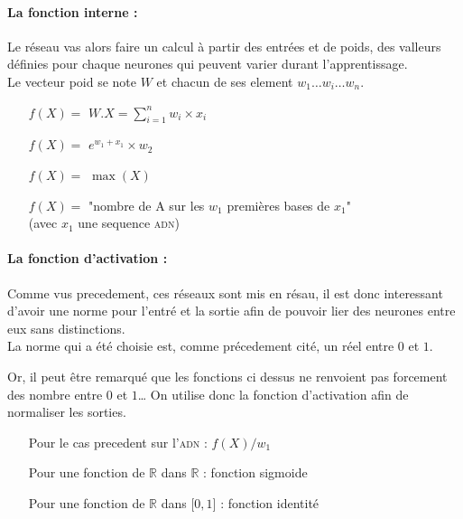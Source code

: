 \paragraph{La fonction interne :}
Le réseau vas alors faire un calcul à partir des entrées et de poids,
des valleurs définies pour chaque neurones qui peuvent varier durant l'apprentissage. \\
Le vecteur poid se note $W$ et chacun de ses element $w_1 \ldots w_i \ldots w_n$.

\exemle
{
\begin{itemize}
    \item[$f(X) =$] $W.X = \sum_{i=1}^{n} w_i \times x_i $
    \item[$f(X) =$] $e^{w_1 + x_1} \times w_2$
    \item[$f(X) =$] $\max(X)$
    \item[$f(X) =$] "nombre de A sur les $w_1$ premières bases de $x_1$" \\
            (avec $x_1$ une sequence \textsc{adn})
\end{itemize}
}

\paragraph{La fonction d'activation :}
Comme vus precedement, ces réseaux sont mis en résau,
il est donc interessant d'avoir une norme pour l'entré et la sortie
afin de pouvoir lier des neurones entre eux sans distinctions. \\
La norme qui a été choisie est, comme précedement cité, un réel entre $0$ et $1$.


Or, il peut être remarqué que les fonctions ci dessus ne renvoient pas forcement des nombre entre $0$ et $1$\ldots
On utilise donc la fonction d'activation afin de normaliser les sorties.
\exemle
{
\begin{itemize}
    \item[Pour le cas precedent sur l'\textsc{adn} :] $f(X)/w_1$
    \item[Pour une fonction de $\mathbb{R}$ dans $\mathbb{R}$ :] fonction sigmoide
    \item[Pour une fonction de $\mathbb{R}$ dans $[0, 1 \rbrack$ :] fonction identité
\end{itemize}
}

